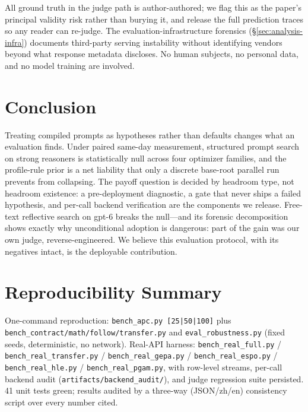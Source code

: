 \documentclass[11pt]{article}
\begin{document}
All ground truth in the judge path is author-authored; we flag this as the paper's principal validity risk rather than burying it, and release the full prediction traces so any reader can re-judge. The evaluation-infrastructure forensics (\S\ref{sec:analysis-infra}) documents third-party serving instability without identifying vendors beyond what response metadata discloses. No human subjects, no personal data, and no model training are involved.

\section{Conclusion}

Treating compiled prompts as hypotheses rather than defaults changes what an evaluation finds. Under paired same-day measurement, structured prompt search on strong reasoners is statistically null across four optimizer families, and the profile-rule prior is a net liability that only a discrete base-root parallel run prevents from collapsing. The payoff question is decided by headroom type, not headroom existence: a pre-deployment diagnostic, a gate that never ships a failed hypothesis, and per-call backend verification are the components we release. Free-text reflective search on gpt-6 breaks the null---and its forensic decomposition shows exactly why unconditional adoption is dangerous: part of the gain was our own judge, reverse-engineered. We believe this evaluation protocol, with its negatives intact, is the deployable contribution.

\label{sec:bib}


\appendix

\section{Reproducibility Summary}
\label{app:repro}
One-command reproduction: \texttt{bench\_apc.py [25|50|100]} plus \texttt{bench\_contract/math/follow/transfer.py} and \texttt{eval\_robustness.py} (fixed seeds, deterministic, no network). Real-API harness: \texttt{bench\_real\_full.py} / \texttt{bench\_real\_transfer.py} / \texttt{bench\_real\_gepa.py} / \texttt{bench\_real\_espo.py} / \texttt{bench\_real\_hle.py} / \texttt{bench\_real\_pgam.py}, with row-level streams, per-call backend audit (\texttt{artifacts/backend\_audit/}), and judge regression suite persisted. 41 unit tests green; results audited by a three-way (JSON/zh/en) consistency script over every number cited.
\end{document}
